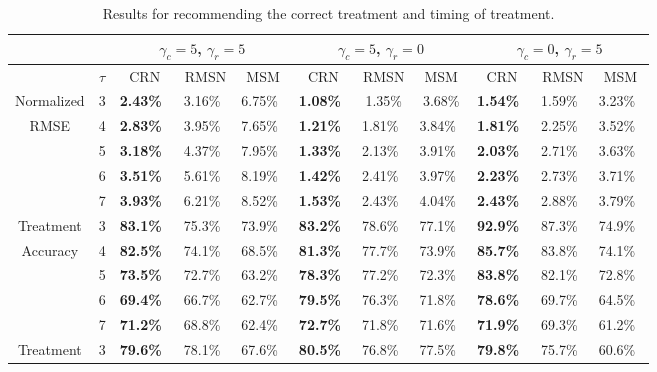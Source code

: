 \documentclass{article} %
\begin{document}
	
	\begin{table}[t]
		\vspace{-0.3cm}
		\caption{Results for recommending the correct treatment and timing of treatment.}
		\label{tab:results_multi_step_prediction}
		\centering
		\setlength\tabcolsep{3.6pt}
	
		\begin{tabular}{c|c|ccc|ccc|ccc} \toprule
			\multicolumn{2}{c}{} & \multicolumn{3}{|c|}{$\gamma_c = 5$, $\gamma_r = 5$}& \multicolumn{3}{|c|}{$\gamma_c = 5$, $\gamma_r = 0$} & \multicolumn{3}{|c}{$\gamma_c = 0$, $\gamma_r = 5$}  \\ \midrule
			{} & {$\tau$} & {CRN} & {RMSN} & {MSM} & {CRN} & {RMSN} & {MSM} & {CRN} & {RMSN} & {MSM} \\ \midrule
			Normalized     & 3 &\textbf{2.43\%~} & 3.16\%~ & 6.75\%~ &\textbf{ 1.08\%}~ & 1.35\% & 3.68\% & \textbf{1.54\%~} & 1.59\%~ & 3.23\%~  \\
			RMSE			 & 4  & \textbf{2.83\%~} & 3.95\%~ & 7.65\%~ & \textbf{1.21\%}~ & 1.81\%~ & 3.84\%~ & \textbf{1.81\%~} & 2.25\%~ & 3.52\%~ \\
			& 5 &  \textbf{3.18\%~} & 4.37\%~ & 7.95\%~ & \textbf{1.33\%}~ & 2.13\%~ & 3.91\%~ &\textbf{2.03\%~} & 2.71\%~ & 3.63\%~  \\
			& 6 & \textbf{3.51\%~} & 5.61\%~ & 8.19\%~ & \textbf{1.42\%}~ & 2.41\%~ & 3.97\%~ & \textbf{2.23\%~} & 2.73\%~ & 3.71\%~ \\
			& 7 & \textbf{3.93\%~} & 6.21\%~ & 8.52\%~ & \textbf{1.53\%}~ & 2.43\%~ & 4.04\%~ & \textbf{2.43\%~} & 2.88\%~ & 3.79\%~ \\
			\midrule
			Treatment & 3 & \textbf{83.1\%~} & 75.3\%~ & 73.9\%~ & \textbf{83.2\%}~ & 78.6\%~ & 77.1\%~ & \textbf{92.9\%~} & 87.3\%~ & 74.9\%~ \\
			Accuracy  & 4 & \textbf{82.5\%~} & 74.1\%~ & 68.5\%~ &\textbf{81.3\%}~ & 77.7\%~ & 73.9\%~ & \textbf{85.7\%~} & 83.8\%~ & 74.1\%~ \\
			& 5 & \textbf{73.5\%~} & 72.7\%~ & 63.2\%~ & \textbf{78.3\%}~ & 77.2\%~ & 72.3\%~ & \textbf{83.8\%~} & 82.1\%~ & 72.8\%~ \\
			& 6 & \textbf{69.4\%~} & 66.7\%~ & 62.7\%~ & \textbf{79.5\%}~ & 76.3\%~ & 71.8\%~ & \textbf{78.6\%~} & 69.7\%~ & 64.5\%~ \\
			& 7 & \textbf{71.2\%~} & 68.8\%~ & 62.4\%~ & \textbf{72.7\%}~ & 71.8\%~ & 71.6\%~ & \textbf{71.9\%~} & 69.3\%~ & 61.2\%~ \\
			\midrule
			Treatment    & 3 & \textbf{79.6\%~} & 78.1\%~ & 67.6\%~ & \textbf{80.5\%}~ & 76.8\%~ &  77.5\%~ & \textbf{79.8\%~} & 75.7\%~ & 60.6\%~ \\

\end{tabular}
\end{table}
\end{document}
